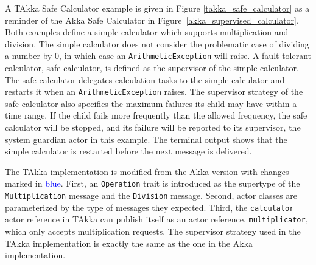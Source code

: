 A TAkka Safe Calculator example is given in Figure 
\ref{takka_safe_calculator} as a reminder of the Akka Safe Calculator in 
Figure~\ref{akka_supervised_calculator}. Both examples define a simple 
calculator which supports multiplication and division. The simple calculator 
does not consider the problematic case of dividing a number by 0, in which case 
an {\tt ArithmeticException} will raise. A fault tolerant calculator, safe 
calculator, is defined as the supervisor of the simple calculator. The safe 
calculator delegates calculation tasks to the simple calculator and restarts 
it when an {\tt ArithmeticException} raises. The supervisor 
strategy of the safe calculator also specifies the maximum failures its child 
may have within a time range. If the child fails more frequently than the 
allowed frequency, the safe calculator will be stopped, and its failure will be 
reported to its supervisor, the system guardian actor in this example.  The 
terminal output shows that the simple calculator is restarted before the next 
message is delivered.

The TAkka implementation is modified from the Akka version with changes marked 
in \textcolor{blue}{blue}.  First, an {\tt Operation} trait is introduced as 
the supertype of the {\tt Multiplication} message and the {\tt Division} 
message.  Second, actor classes are parameterized by the type of messages they 
expected.  Third, the {\tt calculator} actor reference in TAkka can publish 
itself as an actor reference, {\tt multiplicator}, which only accepts 
multiplication requests. The supervisor strategy used in the TAkka 
implementation is exactly the same as the one in the Akka implementation.

